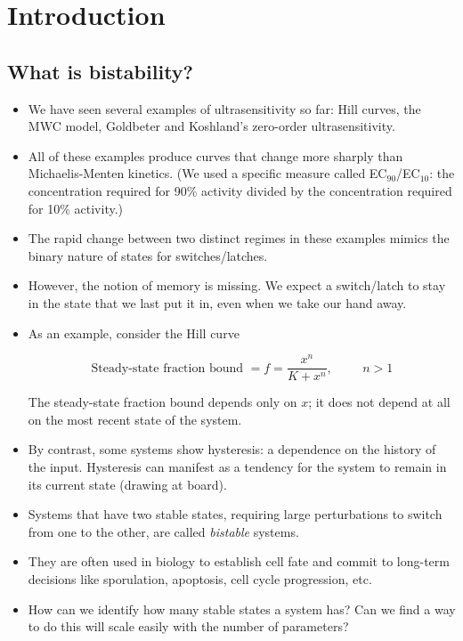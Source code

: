 \documentclass{article}
\begin{document}
\large

\section*{Introduction}

\subsection*{What is bistability?}

\begin{itemize}
\item We have seen several examples of ultrasensitivity so far: Hill curves, the MWC model, Goldbeter and Koshland's zero-order ultrasensitivity.
\item All of these examples produce curves that change more sharply than Michaelis-Menten kinetics. (We used a specific measure called EC$_{90}$/EC$_{10}$: the concentration required for 90\% activity divided by the concentration required for 10\% activity.)
\item The rapid change between two distinct regimes in these examples mimics the binary nature of states for switches/latches.
\item However, the notion of memory is missing. We expect a switch/latch to stay in the state that we last put it in, even when we take our hand away.
\item As an example, consider the Hill curve

\[ \textrm{Steady-state fraction bound } = f = \frac{x^n}{K+x^n} , \hspace{1cm} n > 1\]

The steady-state fraction bound depends only on $x$; it does not depend at all on the most recent state of the system.

\item By contrast, some systems show hysteresis: a dependence on the history of the input. Hysteresis can manifest as a tendency for the system to remain in its current state (drawing at board).

\item Systems that have two stable states, requiring large perturbations to switch from one to the other, are called \textit{bistable} systems.

\item They are often used in biology to establish cell fate and commit to long-term decisions like sporulation, apoptosis, cell cycle progression, etc.

\item How can we identify how many stable states a system has? Can we find a way to do this will scale easily with the number of parameters?
 
\end{itemize}
\end{document}
